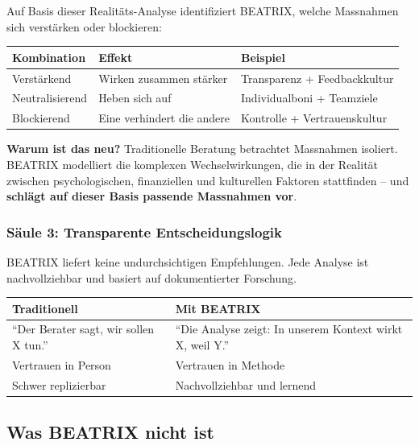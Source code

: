 \documentclass[11pt,a4paper]{article}
\begin{document}
Auf Basis dieser Realitäts-Analyse identifiziert BEATRIX, welche Massnahmen sich verstärken oder blockieren:

\begin{table}[h]
\centering
\begin{tabular}{@{}L{3cm}L{4cm}L{6cm}@{}}
\toprule
\textbf{Kombination} & \textbf{Effekt} & \textbf{Beispiel} \\
\midrule
Verstärkend & Wirken zusammen stärker & Transparenz + Feedbackkultur \\
Neutralisierend & Heben sich auf & Individualboni + Teamziele \\
Blockierend & Eine verhindert die andere & Kontrolle + Vertrauenskultur \\
\bottomrule
\end{tabular}
\end{table}

\textbf{Warum ist das neu?} Traditionelle Beratung betrachtet Massnahmen isoliert. BEATRIX modelliert die komplexen Wechselwirkungen, die in der Realität zwischen psychologischen, finanziellen und kulturellen Faktoren stattfinden -- und \textbf{schlägt auf dieser Basis passende Massnahmen vor}.

\subsubsection{Säule 3: Transparente Entscheidungslogik}

BEATRIX liefert keine undurchsichtigen Empfehlungen. Jede Analyse ist nachvollziehbar und basiert auf dokumentierter Forschung.

\begin{table}[h]
\centering
\begin{tabular}{@{}L{6cm}L{7cm}@{}}
\toprule
\textbf{Traditionell} & \textbf{Mit BEATRIX} \\
\midrule
``Der Berater sagt, wir sollen X tun.'' & ``Die Analyse zeigt: In unserem Kontext wirkt X, weil Y.'' \\
Vertrauen in Person & Vertrauen in Methode \\
Schwer replizierbar & Nachvollziehbar und lernend \\
\bottomrule
\end{tabular}
\end{table}

\subsection{Was BEATRIX nicht ist}
\end{document}
